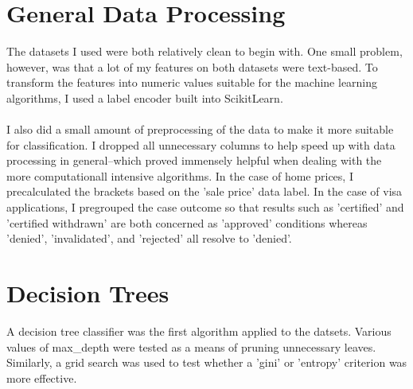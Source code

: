 \documentclass[h]{article}
\begin{document}
  \section*{General Data Processing}
  The datasets I used were both relatively clean to begin with.  One small 
  problem, however, was that a lot of my features on both datasets were 
  text-based.  To transform the features into numeric values suitable for the 
  machine learning algorithms, I used a label encoder built into ScikitLearn.
  \\ \\
  I also did a small amount of preprocessing of the data to make it more 
  suitable for classification.  I dropped all unnecessary columns to help 
  speed up with data processing in general--which proved immensely helpful when 
  dealing with the more computationall intensive algorithms.  In the 
  case of home prices, I precalculated the brackets based on the 'sale price' data label.  
  In the case of visa applications, I pregrouped the case outcome so that 
  results such as 'certified' and 'certified withdrawn' are both concerned as 
  'approved' conditions whereas 'denied', 'invalidated', and 'rejected' all 
  resolve to 'denied'.
  
 \section*{Decision Trees}
 A decision tree classifier was the first algorithm applied to the datsets.  
 Various values of max\_depth were tested as a means of pruning unnecessary 
 leaves.  Similarly, a grid search was used to test whether a 'gini' or 
 'entropy' criterion was more effective.
\end{document}
